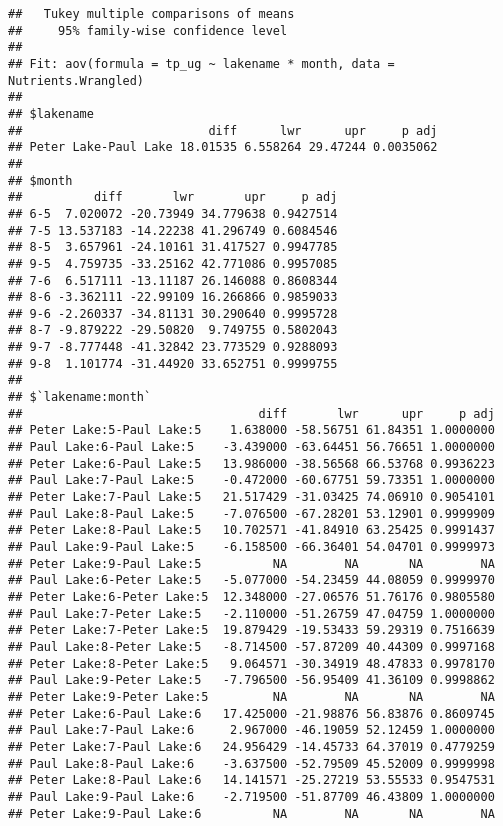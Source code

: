 \documentclass[]{article}
\begin{document}
\begin{verbatim}
##   Tukey multiple comparisons of means
##     95% family-wise confidence level
## 
## Fit: aov(formula = tp_ug ~ lakename * month, data = Nutrients.Wrangled)
## 
## $lakename
##                          diff      lwr      upr     p adj
## Peter Lake-Paul Lake 18.01535 6.558264 29.47244 0.0035062
## 
## $month
##          diff       lwr       upr     p adj
## 6-5  7.020072 -20.73949 34.779638 0.9427514
## 7-5 13.537183 -14.22238 41.296749 0.6084546
## 8-5  3.657961 -24.10161 31.417527 0.9947785
## 9-5  4.759735 -33.25162 42.771086 0.9957085
## 7-6  6.517111 -13.11187 26.146088 0.8608344
## 8-6 -3.362111 -22.99109 16.266866 0.9859033
## 9-6 -2.260337 -34.81131 30.290640 0.9995728
## 8-7 -9.879222 -29.50820  9.749755 0.5802043
## 9-7 -8.777448 -41.32842 23.773529 0.9288093
## 9-8  1.101774 -31.44920 33.652751 0.9999755
## 
## $`lakename:month`
##                                 diff       lwr      upr     p adj
## Peter Lake:5-Paul Lake:5    1.638000 -58.56751 61.84351 1.0000000
## Paul Lake:6-Paul Lake:5    -3.439000 -63.64451 56.76651 1.0000000
## Peter Lake:6-Paul Lake:5   13.986000 -38.56568 66.53768 0.9936223
## Paul Lake:7-Paul Lake:5    -0.472000 -60.67751 59.73351 1.0000000
## Peter Lake:7-Paul Lake:5   21.517429 -31.03425 74.06910 0.9054101
## Paul Lake:8-Paul Lake:5    -7.076500 -67.28201 53.12901 0.9999909
## Peter Lake:8-Paul Lake:5   10.702571 -41.84910 63.25425 0.9991437
## Paul Lake:9-Paul Lake:5    -6.158500 -66.36401 54.04701 0.9999973
## Peter Lake:9-Paul Lake:5          NA        NA       NA        NA
## Paul Lake:6-Peter Lake:5   -5.077000 -54.23459 44.08059 0.9999970
## Peter Lake:6-Peter Lake:5  12.348000 -27.06576 51.76176 0.9805580
## Paul Lake:7-Peter Lake:5   -2.110000 -51.26759 47.04759 1.0000000
## Peter Lake:7-Peter Lake:5  19.879429 -19.53433 59.29319 0.7516639
## Paul Lake:8-Peter Lake:5   -8.714500 -57.87209 40.44309 0.9997168
## Peter Lake:8-Peter Lake:5   9.064571 -30.34919 48.47833 0.9978170
## Paul Lake:9-Peter Lake:5   -7.796500 -56.95409 41.36109 0.9998862
## Peter Lake:9-Peter Lake:5         NA        NA       NA        NA
## Peter Lake:6-Paul Lake:6   17.425000 -21.98876 56.83876 0.8609745
## Paul Lake:7-Paul Lake:6     2.967000 -46.19059 52.12459 1.0000000
## Peter Lake:7-Paul Lake:6   24.956429 -14.45733 64.37019 0.4779259
## Paul Lake:8-Paul Lake:6    -3.637500 -52.79509 45.52009 0.9999998
## Peter Lake:8-Paul Lake:6   14.141571 -25.27219 53.55533 0.9547531
## Paul Lake:9-Paul Lake:6    -2.719500 -51.87709 46.43809 1.0000000
## Peter Lake:9-Paul Lake:6          NA        NA       NA        NA

\end{verbatim}
\end{document}
